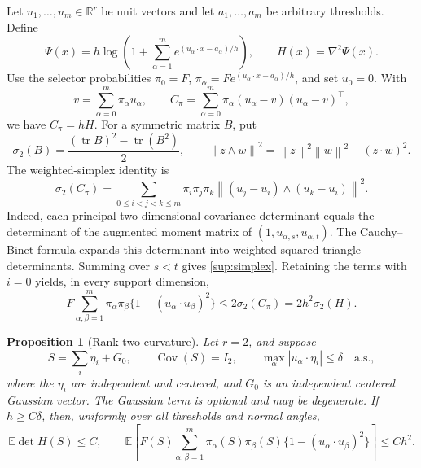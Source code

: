 \documentclass[11pt,a4paper]{article}
\newtheorem{proposition}{Proposition}
\theoremstyle{remark}
\newcommand{\E}{\mathbb E}
\newcommand{\R}{\mathbb R}
\newcommand{\Cov}{\operatorname{Cov}}
\newcommand{\tr}{\operatorname{tr}}
\newcommand{\norm}[1]{\left\lVert#1\right\rVert}
\begin{document}
Let \(u_1,\ldots,u_m\in\R^r\) be unit vectors and let
\(a_1,\ldots,a_m\) be arbitrary thresholds. Define
\[
 \Psi(x)=h\log\left(1+\sum_{\alpha=1}^m
                    e^{(u_\alpha\cdot x-a_\alpha)/h}\right),
 \qquad H(x)=\nabla^2\Psi(x).
\]
Use the selector probabilities
\(\pi_0=F\),
\(\pi_\alpha=Fe^{(u_\alpha\cdot x-a_\alpha)/h}\), and set
\(u_0=0\). With
\[
 v=\sum_{\alpha=0}^m\pi_\alpha u_\alpha,\qquad
 C_\pi=\sum_{\alpha=0}^m\pi_\alpha
             (u_\alpha-v)(u_\alpha-v)^\top,
\]
we have \(C_\pi=hH\). For a symmetric matrix \(B\), put
\[
 \sigma_2(B)=\frac{(\tr B)^2-\tr(B^2)}2,
 \qquad
 \norm{z\wedge w}^2=\norm z^2\norm w^2-(z\cdot w)^2.
\]
The weighted-simplex identity is
\begin{equation}
 \sigma_2(C_\pi)
 =\sum_{0\le i<j<k\le m}
     \pi_i\pi_j\pi_k
       \norm{(u_j-u_i)\wedge(u_k-u_i)}^2.
 \label{sup:simplex}
\end{equation}
Indeed, each principal two-dimensional covariance determinant equals
the determinant of the augmented moment matrix of
\((1,u_{\alpha,s},u_{\alpha,t})\). The Cauchy--Binet formula expands
this determinant into weighted squared triangle determinants.
Summing over \(s<t\) gives \eqref{sup:simplex}. Retaining the
terms with \(i=0\) yields, in every support dimension,
\begin{equation}
 F\sum_{\alpha,\beta=1}^m
    \pi_\alpha\pi_\beta\{1-(u_\alpha\cdot u_\beta)^2\}
 \le 2\sigma_2(C_\pi)=2h^2\sigma_2(H).
 \label{sup:angle-curvature}
\end{equation}

\begin{proposition}[Rank-two curvature]
\label{sup:rank-two}
Let \(r=2\), and suppose
\[
 S=\sum_i\eta_i+G_0,\qquad \Cov(S)=I_2,
 \qquad \max_\alpha|u_\alpha\cdot\eta_i|\le\delta
 \quad\text{a.s.},
\]
where the \(\eta_i\) are independent and centered, and \(G_0\)
is an independent centered Gaussian vector. The Gaussian term is
optional and may be degenerate. If \(h\ge C\delta\), then,
uniformly over all thresholds and normal angles,
\begin{equation}
 \E\det H(S)\le C,
 \qquad
 \E\left[F(S)\sum_{\alpha,\beta=1}^m
   \pi_\alpha(S)\pi_\beta(S)
       \{1-(u_\alpha\cdot u_\beta)^2\}\right]\le Ch^2.
 \label{sup:rank-two-bound}
\end{equation}
\end{proposition}
\end{document}
